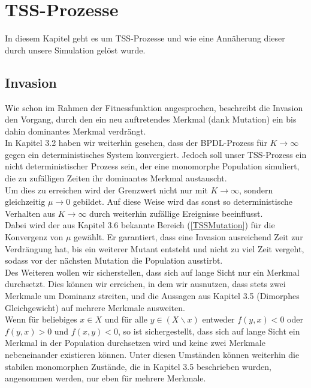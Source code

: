 \documentclass[11pt, a4paper, german]{article}
\theoremstyle{plain}
\begin{document}
	
\section{TSS-Prozesse}
In diesem Kapitel geht es um TSS-Prozesse und wie eine Annäherung dieser durch unsere Simulation gelöst wurde.
	\subsection{Invasion}
	Wie schon im Rahmen der Fitnessfunktion angesprochen, beschreibt die Invasion den Vorgang, durch den ein neu auftretendes Merkmal (dank Mutation) ein bis dahin dominantes Merkmal verdrängt.\\
	In Kapitel 3.2 haben wir weiterhin gesehen, dass der BPDL-Prozess für $ K \to \infty $ gegen ein deterministisches System konvergiert. Jedoch soll unser TSS-Prozess ein nicht deterministischer Prozess sein, der eine monomorphe Population simuliert, die zu zufälligen Zeiten ihr dominantes Merkmal austauscht.\\
	Um dies zu erreichen wird der Grenzwert nicht nur mit $ K \to \infty $, sondern gleichzeitig $ \mu \to 0 $ gebildet. Auf diese Weise wird das sonst so deterministische Verhalten aus $ K \to \infty $ durch weiterhin zufällige Ereignisse beeinflusst.\\
	Dabei wird der aus Kapitel 3.6 bekannte Bereich (\ref{TSSMutation}) für die Konvergenz von $ \mu $ gewählt. Er garantiert, dass eine Invasion ausreichend Zeit zur Verdrängung hat, bis ein weiterer Mutant entsteht und nicht zu viel Zeit vergeht, sodass vor der nächsten Mutation die Population ausstirbt.\\
	Des Weiteren wollen wir sicherstellen, dass sich auf lange Sicht nur ein Merkmal durchsetzt. Dies können wir erreichen, in dem wir ausnutzen, dass stets zwei Merkmale um Dominanz streiten, und die Aussagen aus Kapitel 3.5 (Dimorphes Gleichgewicht) auf mehrere Merkmale ausweiten.\\
	Wenn für beliebiges $ x \in X $ und für alle $ y \in (X\backslash x) $ entweder $ f(y,x) < 0 $ oder $ f(y,x) > 0 $ und $ f(x,y) < 0 $, so ist sichergestellt, dass sich auf lange Sicht ein Merkmal in der Population durchsetzen wird und keine zwei Merkmale nebeneinander existieren können. Unter diesen Umständen können weiterhin die stabilen monomorphen Zustände, die in Kapitel 3.5 beschrieben wurden, angenommen werden, nur eben für mehrere Merkmale.\\
	
\end{document}
